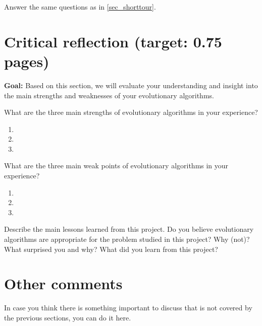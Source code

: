 \documentclass[a4paper,10pt]{article}
\newcommand{\ReplaceMe}[1]{{\color{blue}#1}}
\newcommand{\RemoveMe}[1]{{\color{purple}#1}}
\begin{document}
\ReplaceMe{Answer the same questions as in \cref{sec_shorttour}.}

\section{Critical reflection (target: 0.75 pages)}

\RemoveMe{\textbf{Goal:} Based on this section, we will evaluate your understanding and insight into the main strengths and weaknesses of your evolutionary algorithms.}

\ReplaceMe{What are the three main strengths of evolutionary algorithms in your experience?}

\begin{enumerate}
 \item 
 \item 
 \item 
\end{enumerate}

\ReplaceMe{What are the three main weak points of evolutionary algorithms in your experience?}

\begin{enumerate}
 \item 
 \item 
 \item 
\end{enumerate}

\ReplaceMe{Describe the main lessons learned from this project. Do you believe evolutionary algorithms are appropriate for the problem studied in this project? Why (not)? What surprised you and why? What did you learn from this project?}

\section{Other comments} \label{sec_other}

\ReplaceMe{In case you think there is something important to discuss that is not covered by the previous sections, you can do it here. }



\end{document}
